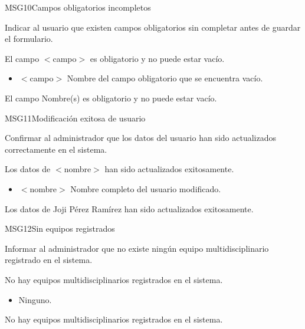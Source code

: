 \begin{cdtMessage}[msgErrorColor]{MSG10}{Campos obligatorios incompletos}
	\item[Propósito:] Indicar al usuario que existen campos 
	obligatorios sin completar antes de guardar el formulario.
	\item[Redacción:] El campo $<$campo$>$ es obligatorio 
	y no puede estar vacío.
	\item[Parámetros:] \hspace{1cm}
	\begin{itemize}
		\item $<$campo$>$ Nombre del campo obligatorio 
		que se encuentra vacío.
	\end{itemize}
	\item[Ejemplos:] El campo Nombre(s) es obligatorio 
	y no puede estar vacío.
\end{cdtMessage}

\begin{cdtMessage}[msgInfoColor]{MSG11}{Modificación exitosa de usuario}
	\item[Propósito:] Confirmar al administrador que los datos 
	del usuario han sido actualizados correctamente en el sistema.
	\item[Redacción:] Los datos de $<$nombre$>$ han sido 
	actualizados exitosamente.
	\item[Parámetros:] \hspace{1cm}
	\begin{itemize}
		\item $<$nombre$>$ Nombre completo del usuario modificado.
	\end{itemize}
	\item[Ejemplos:] Los datos de Joji Pérez Ramírez han sido 
	actualizados exitosamente.
\end{cdtMessage}


\begin{cdtMessage}[msgWarningColor]{MSG12}{Sin equipos registrados}
	\item[Propósito:] Informar al administrador que no existe 
	ningún equipo multidisciplinario registrado en el sistema.
	\item[Redacción:] No hay equipos multidisciplinarios 
	registrados en el sistema.
	\item[Parámetros:] \hspace{1cm}
	\begin{itemize}
		\item Ninguno.
	\end{itemize}
	\item[Ejemplos:] No hay equipos multidisciplinarios 
	registrados en el sistema.
\end{cdtMessage}

